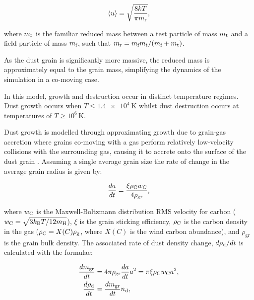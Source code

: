 \begin{equation}
  \langle u \rangle = \sqrt{\frac{8kT}{\pi m _\text{r}}} ,
\end{equation}

\noindent
where $m _\text{r}$ is the familiar reduced mass between a test particle of mass $m _\text{t}$ and a field particle of mass $m _\text{f}$, such that $m _\text{r} = m _\text{f} m _\text{t} / (m _\text{f} + m _\text{t})$.

\noindent
As the dust grain is significantly more massive, the reduced mass is approximately equal to the grain mass, simplifying the dynamics of the simulation in a co-moving case.

In this model, growth and destruction occur in distinct temperature regimes.
Dust growth occurs when $T \leq \SI{1.4e4}{\kelvin}$ whilst dust destruction occurs at temperatures of $T \geq 10^6 \, \si{\kelvin}$.

Dust growth is modelled through approximating growth due to grain-gas accretion where grains co-moving with a gas perform relatively low-velocity collisions with the surrounding gas, causing it to accrete onto the surface of the dust grain 
\parencite{spitzerPhysicalProcessesInterstellar2008}.
Assuming a single average grain size the rate of change in the average grain radius is given by:

\begin{equation}
  \frac{da}{dt} = \frac{\xi \rho_\text{C} w_\text{C}}{4 \rho_\text{gr}} ,
\end{equation}

\noindent
where $w_\text{C}$ is the Maxwell-Boltzmann distribution RMS velocity for carbon ($w_\text{C} = \sqrt{3 k_\text{B} T/12 m_\text{H}}$), $\xi$ is the grain sticking efficiency, $\rho_\text{C}$ is the carbon density in the gas ($\rho_\text{C} = X(C)\rho_\text{g}$, where $X(C)$ is the wind carbon abundance), and $\rho_\text{gr}$ is the grain bulk density.
The associated rate of dust density change, $d\rho_\text{d}/dt$ is calculated with the formulae:



\begin{subequations}
  \begin{align}
    \frac{dm_\text{gr}}{dt} & = 4\pi \rho_\text{gr} \frac{da}{dt} a^2 = \pi \xi \rho_\text{C} w_\text{C} a^2, \\
    \frac{d\rho_\text{d}}{dt} & = \frac{dm_\text{gr}}{dt} n_\text{d} ,
  \end{align}
\end{subequations}


